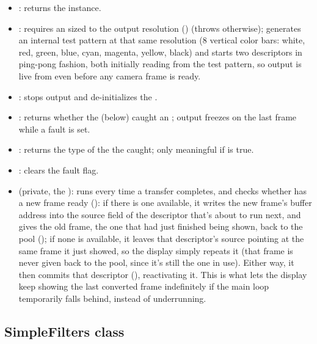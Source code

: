 \begin{itemize}
    \item {}: returns the  instance.
    \item {}: requires an   sized to the  output resolution () (throws  otherwise); generates an internal test pattern at that same resolution (8 vertical color bars: white, red, green, blue, cyan, magenta, yellow, black) and starts two descriptors in ping-pong fashion, both initially reading from the test pattern, so  output is live from  even before any camera frame is ready.
    \item {}: stops  output and de-initializes the .
    \item {}: returns whether the  (below) caught an ;  output freezes on the last frame while a fault is set.
    \item {}: returns the type of the  the  caught; only meaningful if  is true.
    \item {}: clears the fault flag.
    \item {} (private, the ): runs every time a transfer completes, and checks whether  has a new frame ready (): if there is one available, it writes the new frame's buffer address into the source field of the descriptor that's about to run next, and gives the old frame, the one that had just finished being shown, back to the pool (); if none is available, it leaves that descriptor's source pointing at the same frame it just showed, so the display simply repeats it (that frame is never given back to the pool, since it's still the one in use). Either way, it then commits that descriptor (), reactivating it. This is what lets the display keep showing the last converted frame indefinitely if the main loop temporarily falls behind, instead of underrunning.
\end{itemize}

\subsection{SimpleFilters class}
\label{subsec:fpgasteel-simple-filters}

